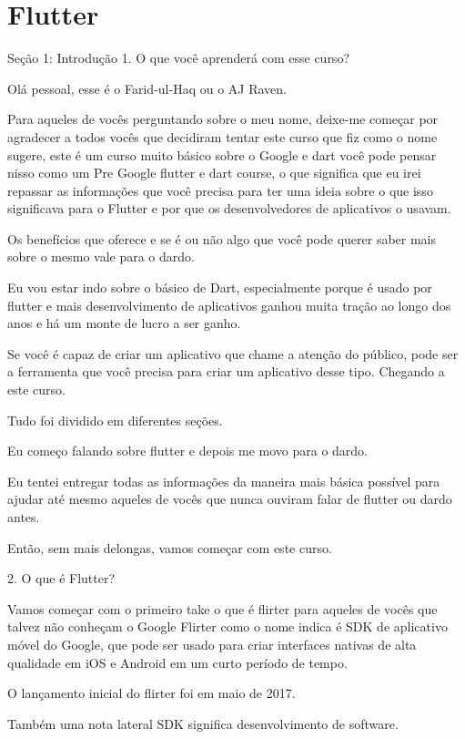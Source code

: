 \section{Flutter}

Seção 1: Introdução
1. O que você aprenderá com esse curso?

Olá pessoal, esse é o Farid-ul-Haq ou o AJ Raven.

Para aqueles de vocês perguntando sobre o meu nome, deixe-me começar por agradecer a todos vocês que decidiram tentar este curso que fiz como o nome sugere, este é um curso muito básico sobre o Google e dart você pode pensar nisso como um Pre Google flutter e dart course, o que significa que eu irei repassar as informações que você precisa para ter uma ideia sobre o que isso significava para o Flutter e por que os desenvolvedores de aplicativos o usavam.

Os benefícios que oferece e se é ou não algo que você pode querer saber mais sobre o mesmo vale para o dardo.

Eu vou estar indo sobre o básico de Dart, especialmente porque é usado por flutter e mais desenvolvimento de aplicativos ganhou muita tração ao longo dos anos e há um monte de lucro a ser ganho.

Se você é capaz de criar um aplicativo que chame a atenção do público, pode ser a ferramenta que você precisa para criar um aplicativo desse tipo. Chegando a este curso.

Tudo foi dividido em diferentes seções.

Eu começo falando sobre flutter e depois me movo para o dardo.

Eu tentei entregar todas as informações da maneira mais básica possível para ajudar até mesmo aqueles de vocês que nunca ouviram falar de flutter ou dardo antes.

Então, sem mais delongas, vamos começar com este curso.



2. O que é Flutter?

Vamos começar com o primeiro take o que é flirter para aqueles de vocês que talvez não conheçam o Google Flirter como o nome indica é SDK de aplicativo móvel do Google, que pode ser usado para criar interfaces nativas de alta qualidade em iOS e Android em um curto período de tempo.

O lançamento inicial do flirter foi em maio de 2017.

Também uma nota lateral SDK significa desenvolvimento de software.

